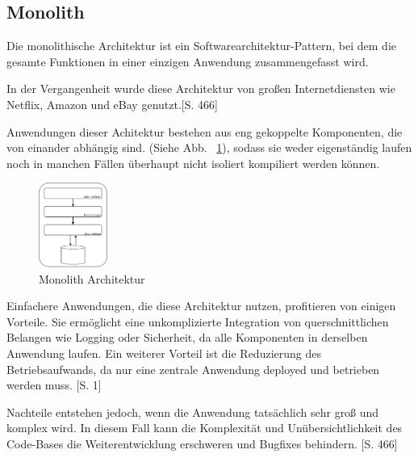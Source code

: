 \documentclass[acmtog]{acmart}
\begin{document}
\subsection{Monolith}
Die monolithische Architektur ist ein Softwarearchitektur-Pattern, bei dem die gesamte Funktionen in 
einer einzigen Anwendung zusammengefasst wird. 

In der Vergangenheit wurde diese Architektur von großen Internetdiensten wie Netflix, 
Amazon und eBay genutzt.\cite{mono}[S. 466]

Anwendungen dieser Achitektur bestehen aus eng gekoppelte Komponenten, die von 
einander abhängig sind. (Siehe Abb. ~\ref{fig:mono}), sodass sie weder eigenständig 
laufen noch in manchen Fällen überhaupt nicht isoliert kompiliert werden können. \cite{mono3}

\begin{figure}[h!]
    \centering
    \includegraphics[width=0.2\textwidth]{images/mono.pdf}
    \caption{Monolith Architektur}
    \label{fig:mono}
\end{figure}

Einfachere Anwendungen, die diese Architektur nutzen, profitieren von einigen Vorteile. 
Sie ermöglicht eine unkomplizierte Integration von querschnittlichen Belangen 
wie Logging oder Sicherheit, da alle Komponenten in derselben Anwendung laufen. 
Ein weiterer Vorteil ist die Reduzierung des Betriebsaufwands, da nur eine 
zentrale Anwendung deployed und betrieben werden muss. \cite{mono2}[S. 1]

Nachteile entstehen jedoch, wenn die Anwendung tatsächlich sehr groß und komplex 
wird. In diesem Fall kann die Komplexität und Unübersichtlichkeit des Code-Bases 
die Weiterentwicklung erschweren und Bugfixes behindern. \cite{mono}[S. 466]
\end{document}

